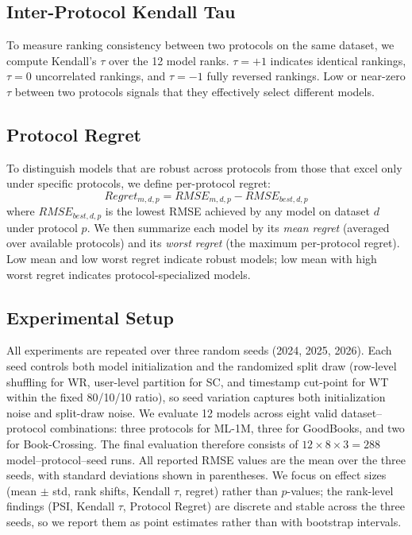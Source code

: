 \documentclass[journal]{IEEEtran}
\begin{document}
\subsection{Inter-Protocol Kendall Tau}
\label{sec:kendall_def}

To measure ranking consistency between two protocols on the same dataset, we compute Kendall's $\tau$ over the 12 model ranks. $\tau=+1$ indicates identical rankings, $\tau=0$ uncorrelated rankings, and $\tau=-1$ fully reversed rankings. Low or near-zero $\tau$ between two protocols signals that they effectively select different models.

\subsection{Protocol Regret}
\label{sec:regret_def}

To distinguish models that are robust across protocols from those that excel only under specific protocols, we define per-protocol regret:
\begin{equation}
Regret_{m,d,p} = RMSE_{m,d,p} - RMSE_{best,d,p}
\label{eq:regret}
\end{equation}
where $RMSE_{best,d,p}$ is the lowest RMSE achieved by any model on dataset $d$ under protocol $p$. We then summarize each model by its \emph{mean regret} (averaged over available protocols) and its \emph{worst regret} (the maximum per-protocol regret). Low mean and low worst regret indicate robust models; low mean with high worst regret indicates protocol-specialized models.

\subsection{Experimental Setup}
\label{sec:setup}

All experiments are repeated over three random seeds (2024, 2025, 2026). Each seed controls both model initialization and the randomized split draw (row-level shuffling for WR, user-level partition for SC, and timestamp cut-point for WT within the fixed 80/10/10 ratio), so seed variation captures both initialization noise and split-draw noise. We evaluate 12 models across eight valid dataset--protocol combinations: three protocols for ML-1M, three for GoodBooks, and two for Book-Crossing. The final evaluation therefore consists of $12 \times 8 \times 3 = 288$ model--protocol--seed runs. All reported RMSE values are the mean over the three seeds, with standard deviations shown in parentheses. We focus on effect sizes (mean $\pm$ std, rank shifts, Kendall $\tau$, regret) rather than $p$-values; the rank-level findings (PSI, Kendall $\tau$, Protocol Regret) are discrete and stable across the three seeds, so we report them as point estimates rather than with bootstrap intervals.
\end{document}
